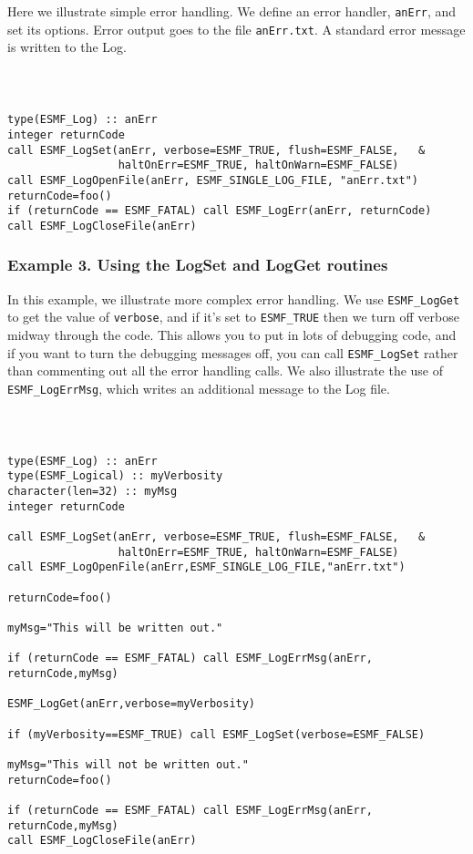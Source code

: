 Here we illustrate simple error handling.  We define an error handler, 
{\tt anErr}, and set its options.  Error output goes to the file 
{\tt anErr.txt}.  A standard error message is written to the Log.  

{\tt
\begin{verbatim}

type(ESMF_Log) :: anErr
integer returnCode 
call ESMF_LogSet(anErr, verbose=ESMF_TRUE, flush=ESMF_FALSE,   &
                 haltOnErr=ESMF_TRUE, haltOnWarn=ESMF_FALSE)
call ESMF_LogOpenFile(anErr, ESMF_SINGLE_LOG_FILE, "anErr.txt")
returnCode=foo()
if (returnCode == ESMF_FATAL) call ESMF_LogErr(anErr, returnCode) 
call ESMF_LogCloseFile(anErr)
\end{verbatim}
\tt}

\subsubsection{Example 3. Using the LogSet and LogGet routines}

In this example, we illustrate more complex error handling.  We use
{\tt ESMF\_LogGet} to get the value of {\tt verbose}, and if it's set to 
{\tt ESMF\_TRUE} then we turn off verbose midway through the code.  This allows 
you to put in lots of debugging code, and if you want to turn the debugging
messages off, you can call {\tt ESMF\_LogSet} rather than commenting out all 
the error handling calls.  We also illustrate the use of {\tt ESMF\_LogErrMsg},
which writes an additional message to the Log file.

{\tt
\begin{verbatim}

type(ESMF_Log) :: anErr
type(ESMF_Logical) :: myVerbosity
character(len=32) :: myMsg
integer returnCode 

call ESMF_LogSet(anErr, verbose=ESMF_TRUE, flush=ESMF_FALSE,   &
                 haltOnErr=ESMF_TRUE, haltOnWarn=ESMF_FALSE)
call ESMF_LogOpenFile(anErr,ESMF_SINGLE_LOG_FILE,"anErr.txt")

returnCode=foo()

myMsg="This will be written out."

if (returnCode == ESMF_FATAL) call ESMF_LogErrMsg(anErr, returnCode,myMsg) 

ESMF_LogGet(anErr,verbose=myVerbosity)

if (myVerbosity==ESMF_TRUE) call ESMF_LogSet(verbose=ESMF_FALSE)

myMsg="This will not be written out."
returnCode=foo()

if (returnCode == ESMF_FATAL) call ESMF_LogErrMsg(anErr, returnCode,myMsg)
call ESMF_LogCloseFile(anErr)

\end{verbatim}
\tt}


